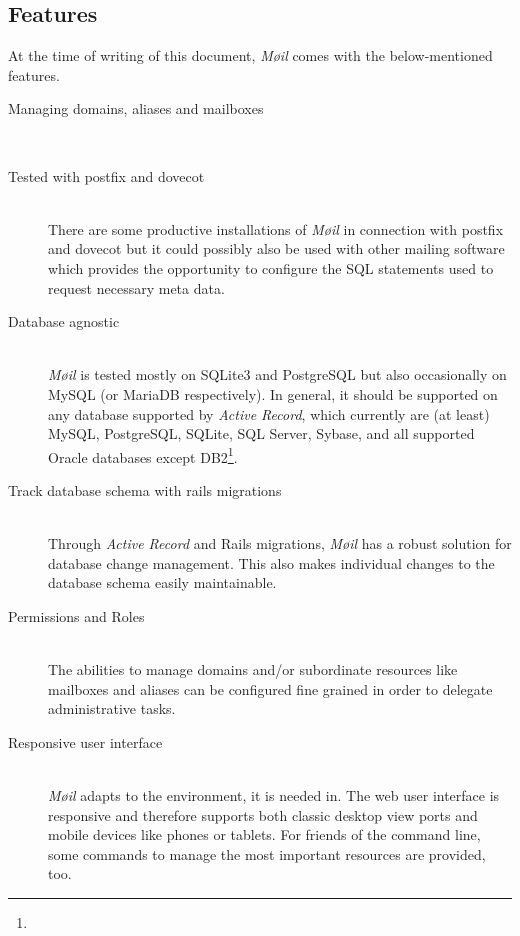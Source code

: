 \documentclass[12pt,a4paper]{scrartcl}
\begin{document}


		\subsection{Features}
		\label{sec:moeil:features}
			At the time of writing of this document, \emph{Møil} comes with the
			below-mentioned features.

			\begin{description}
				\item[\rm Managing domains, aliases and mailboxes]\ \\
					\todo

				\item[\rm Tested with postfix and dovecot]\ \\
					There are some productive installations of \emph{Møil} in
					connection with postfix and dovecot but it could possibly
					also be used with other mailing software which provides the
					opportunity to configure the \ac{SQL} statements used to
					request necessary meta data.
				
				\item[\rm Database agnostic]\ \\
					\emph{Møil} is tested mostly on SQLite3 and PostgreSQL but
					also occasionally on MySQL (or MariaDB respectively). In
					general, it should be supported on any database supported
					by \emph{Active Record}, which currently are (at least)
					MySQL, PostgreSQL, SQLite, SQL Server, Sybase, and all
					supported Oracle databases except
					DB2\footnote{\urlARSupport}.

				\item[\rm Track database schema with rails migrations]\ \\
					Through \emph{Active Record} and \ac{Rails} migrations,
					\emph{Møil} has a robust solution for database change
					management. This also makes individual changes to the
					database schema easily maintainable.

				\item[\rm Permissions and Roles]\ \\
					The abilities to manage domains and/or subordinate
					resources like mailboxes and aliases can be configured fine
					grained in order to delegate administrative tasks.

				\item[\rm Responsive user interface]\ \\
					\emph{Møil} adapts to the environment, it is needed in. The
					web user interface is responsive and therefore supports
					both classic desktop view ports and mobile devices like
					phones or tablets. For friends of the command line, some
					commands to manage the most important resources are
					provided, too.


\end{description}
\end{document}
